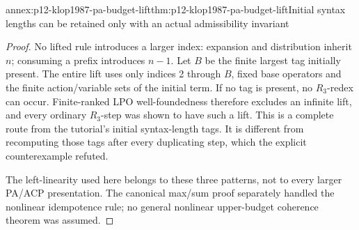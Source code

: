 \begin{annexitem}{annex:p12-klop1987-pa-budget-lift}{thm:p12-klop1987-pa-budget-lift}{Initial syntax lengths can be retained only with an actual admissibility invariant}
\begin{proof}
No lifted rule introduces a larger index: expansion and distribution
inherit \(n\); consuming a prefix introduces \(n-1\).
Let \(B\) be the finite largest tag initially present. The entire
lift uses only indices 2 through \(B\), fixed base operators and
the finite action/variable sets of the initial term. If no tag is
present, no \(R_3\)-redex can occur. Finite-ranked LPO
well-foundedness therefore excludes an infinite lift, and every
ordinary \(R_3\)-step was shown to have such a lift. This is
a complete route from the tutorial's initial syntax-length tags.
It is different from recomputing those tags after every duplicating
step, which the explicit counterexample refuted.

The left-linearity used here belongs to these three patterns,
not to every larger PA/ACP presentation. The canonical max/sum
proof separately handled the nonlinear idempotence rule; no
general nonlinear upper-budget coherence theorem was assumed.
\end{proof}
\end{annexitem}

